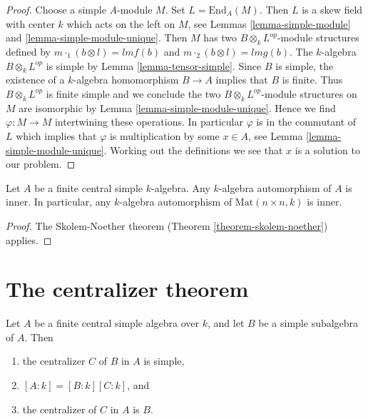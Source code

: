 \begin{proof}
Choose a simple $A$-module $M$. Set $L = \text{End}_A(M)$.
Then $L$ is a skew field with center $k$ which acts on the left on $M$, see
Lemmas \ref{lemma-simple-module} and \ref{lemma-simple-module-unique}.
Then $M$ has two $B \otimes_k L^{op}$-module structures defined by
$m \cdot_1 (b \otimes l) = lmf(b)$ and $m \cdot_2 (b \otimes l) = lmg(b)$.
The $k$-algebra $B \otimes_k L^{op}$ is simple by
Lemma \ref{lemma-tensor-simple}. Since $B$ is simple, the existence of a
$k$-algebra homomorphism $B \to A$ implies that $B$ is finite. Thus
$B \otimes_k L^{op}$ is finite simple and we conclude the two
$B \otimes_k L^{op}$-module structures on $M$
are isomorphic by Lemma \ref{lemma-simple-module-unique}.
Hence we find $\varphi : M \to M$ intertwining these operations.
In particular $\varphi$ is in the commutant of $L$ which implies that
$\varphi$ is multiplication by some $x \in A$, see
Lemma \ref{lemma-simple-module-unique}. Working out the definitions we see
that $x$ is a solution to our problem.
\end{proof}

\begin{lemma}
\label{lemma-automorphism-inner}
Let $A$ be a finite central simple $k$-algebra. Any $k$-algebra
automorphism of $A$ is inner. In particular, any $k$-algebra automorphism
of $\text{Mat}(n \times n, k)$ is inner.
\end{lemma}

\begin{proof}
The Skolem-Noether theorem (Theorem \ref{theorem-skolem-noether})
applies.
\end{proof}



\section{The centralizer theorem}
\label{section-centralizer}


\begin{theorem}
\label{theorem-centralizer}
Let $A$ be a finite central simple algebra over $k$, and let
$B$ be a simple subalgebra of $A$. Then
\begin{enumerate}
\item the centralizer $C$ of $B$ in $A$ is simple,
\item $[A : k] = [B : k][C : k]$, and
\item the centralizer of $C$ in $A$ is $B$.
\end{enumerate}
\end{theorem}

